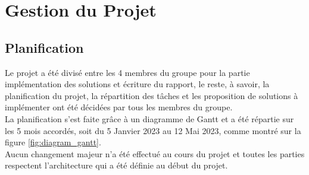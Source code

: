



\chapter{Gestion du Projet}

\section{Planification}
Le projet a été divisé entre les 4 membres du groupe pour la partie implémentation des solutions et écriture du rapport, le reste, à savoir, la planification du projet, la répartition des tâches et les proposition de solutions à implémenter ont été décidées par tous les membres du groupe.\\
La planification s'est faite grâce à un diagramme de Gantt et a été répartie sur les 5 mois accordés, soit du 5 Janvier 2023 au 12 Mai 2023, comme montré sur la figure \ref{fig:diagram_gantt}.\\
Aucun changement majeur n'a été effectué au cours du projet et toutes les parties respectent l'architecture qui a été définie au début du projet.


